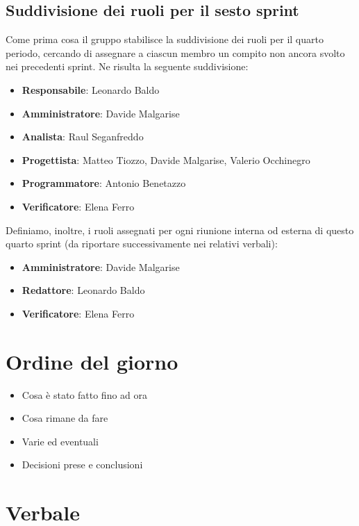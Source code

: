 \documentclass[italian,12pt]{article}
\begin{document}
\subsection{Suddivisione dei ruoli per il sesto sprint}
Come prima cosa il gruppo stabilisce la suddivisione dei ruoli per il quarto periodo, cercando di assegnare a ciascun membro un compito non ancora svolto
nei precedenti sprint. Ne risulta la seguente suddivisione:
\begin{itemize}
	\item \textbf{Responsabile}: Leonardo Baldo
	\item \textbf{Amministratore}: Davide Malgarise
	\item \textbf{Analista}: Raul Seganfreddo
	\item \textbf{Progettista}: Matteo Tiozzo, Davide Malgarise, Valerio Occhinegro
	\item \textbf{Programmatore}: Antonio Benetazzo
	\item \textbf{Verificatore}: Elena Ferro
\end{itemize}
Definiamo, inoltre, i ruoli assegnati per ogni riunione interna od esterna 
di questo quarto sprint (da riportare successivamente nei relativi verbali):
\begin{itemize}
	\item \textbf{Amministratore}: Davide Malgarise
	\item \textbf{Redattore}: Leonardo Baldo
	\item \textbf{Verificatore}: Elena Ferro
\end{itemize}

\section{Ordine del giorno}
\begin{itemize}
	\item Cosa è stato fatto fino ad ora
	\item Cosa rimane da fare
	\item Varie ed eventuali
	\item Decisioni prese e conclusioni
\end{itemize}

\newpage

\section{Verbale}
\end{document}
